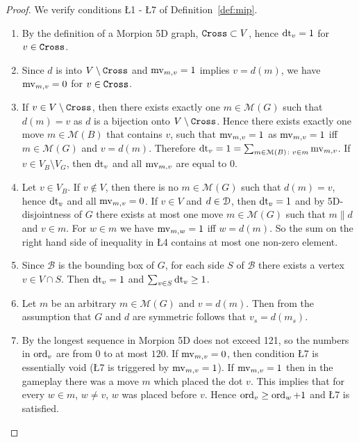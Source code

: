 \begin{proof}
  We verify conditions \L{1} - \L{7} of Definition~\ref{def:mip}.
    
  \begin{enumerate}[label=\L{\arabic*}.]
   \item  By the definition of a Morpion 5D graph, $\texttt{Cross} \subset V$, hence $\operatorname{dt}_v = 1$ for $v \in \texttt{Cross}$.
  \item Since $d$ is into $V \setminus \texttt{Cross}$ and $\operatorname{mv}_{m, v} = 1$ implies $v = d(m)$, we have
    $\operatorname{mv}_{m, v} = 0$ for $v \in \texttt{Cross}$.
  \item If $v \in V \setminus \texttt{Cross}$, then there exists exactly one $m \in \mathcal{M}(G)$ such that $d(m) = v$
     as $d$ is a bijection onto $V \setminus \texttt{Cross}$.
   Hence  there exists exactly one move $m \in \mathcal{M}(B)$ that contains $v$,
     such that $\operatorname{mv}_{m, v} = 1$ as $\operatorname{mv}_{m,v} = 1$ iff $m \in \mathcal{M}(G)$ and $v = d(m)$.
   Therefore $\operatorname{dt}_v = 1 = \sum_{m \in \mathcal{M}(B) \colon v \in m} \operatorname{mv}_{m,v}$.
  If $v \in V_B \setminus V_G$, then $\operatorname{dt}_v$ and all $\operatorname{mv}_{m, v}$ are equal to $0$. 
  \item Let $v \in V_B$. If $v \not\in V$, then there is no $m \in \mathcal{M}(G)$ such that
     $d(m) = v$, hence $\operatorname{dt}_v$ and all $\operatorname{mv}_{m,v} = 0$.
     If $v \in V$ and $d \in \mathcal{D}$, then $\operatorname{dt}_v = 1$ and by 5D-disjointness of $G$ there exists
    at most one move 
    $m \in \mathcal{M}(G)$ such that $m \parallel d$ and $v \in m$. 
    For $w \in m$ we have $\operatorname{mv}_{m, w} = 1$ iff $w = d(m)$.
    So the sum on the right hand side of inequality in \L{4} contains at most one non-zero element.
  \item Since $\mathcal{B}$ is the bounding box of $G$, for each side $S$ of $\mathcal{B}$ there
    exists a vertex $v \in V \cap S$. Then $\operatorname{dt}_v = 1$ and $\sum_{v \in S} \operatorname{dt}_v \geq 1$.  
  \item Let $m$ be an arbitrary $m\in \mathcal{M}(G)$ and $v=d(m)$. Then from the assumption that $G$ and $d$ are symmetric follows
that $v_s=d(m_s)$.
  \item  By \cite{japonczycy} the longest sequence in Morpion 5D does
not exceed 121, so the numbers in $\operatorname{ord}_v$ are from $0$ to at most $120$. If $\operatorname{mv}_{m, v} = 0$, then condition \L{7} is essentially void (\L{7} is triggered by $\operatorname{mv}_{m,v} = 1$).
 If $\operatorname{mv}_{m, v} = 1$ then in the gameplay there was a move $m$ which placed the dot $v$. This implies that for every $w\in m$, $w\neq v$, $w$ was placed before $v$. Hence
$\operatorname{ord}_v \geq \operatorname{ord}_w+1$ and \L{7} is satisfied. 
  \end{enumerate}
\end{proof}
